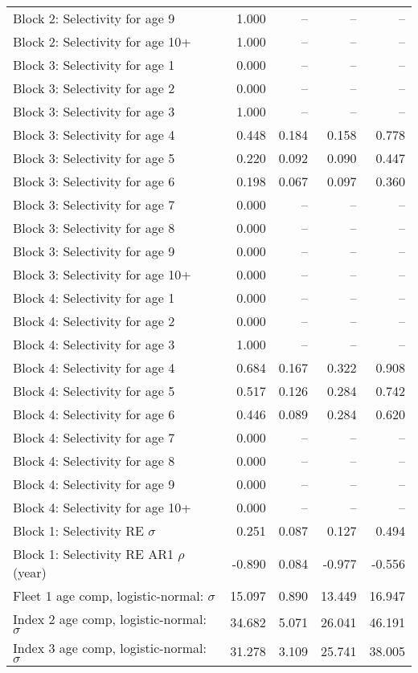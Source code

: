 \documentclass[
]{article}
\begin{document}
\begin{landscape}
\begin{longtable}[t]{lrrrr}
\addlinespace
Block 2: Selectivity for age 9 & 1.000 & -- & -- & --\\
Block 2: Selectivity for age 10+ & 1.000 & -- & -- & --\\
Block 3: Selectivity for age 1 & 0.000 & -- & -- & --\\
Block 3: Selectivity for age 2 & 0.000 & -- & -- & --\\
Block 3: Selectivity for age 3 & 1.000 & -- & -- & --\\
\addlinespace
Block 3: Selectivity for age 4 & 0.448 & 0.184 & 0.158 & 0.778\\
Block 3: Selectivity for age 5 & 0.220 & 0.092 & 0.090 & 0.447\\
Block 3: Selectivity for age 6 & 0.198 & 0.067 & 0.097 & 0.360\\
Block 3: Selectivity for age 7 & 0.000 & -- & -- & --\\
Block 3: Selectivity for age 8 & 0.000 & -- & -- & --\\
\addlinespace
Block 3: Selectivity for age 9 & 0.000 & -- & -- & --\\
Block 3: Selectivity for age 10+ & 0.000 & -- & -- & --\\
Block 4: Selectivity for age 1 & 0.000 & -- & -- & --\\
Block 4: Selectivity for age 2 & 0.000 & -- & -- & --\\
Block 4: Selectivity for age 3 & 1.000 & -- & -- & --\\
\addlinespace
Block 4: Selectivity for age 4 & 0.684 & 0.167 & 0.322 & 0.908\\
Block 4: Selectivity for age 5 & 0.517 & 0.126 & 0.284 & 0.742\\
Block 4: Selectivity for age 6 & 0.446 & 0.089 & 0.284 & 0.620\\
Block 4: Selectivity for age 7 & 0.000 & -- & -- & --\\
Block 4: Selectivity for age 8 & 0.000 & -- & -- & --\\
\addlinespace
Block 4: Selectivity for age 9 & 0.000 & -- & -- & --\\
Block 4: Selectivity for age 10+ & 0.000 & -- & -- & --\\
Block 1: Selectivity RE $\sigma$ & 0.251 & 0.087 & 0.127 & 0.494\\
Block 1: Selectivity RE AR1 $\rho$ (year) & -0.890 & 0.084 & -0.977 & -0.556\\
Fleet 1 age comp, logistic-normal: $\sigma$ & 15.097 & 0.890 & 13.449 & 16.947\\
\addlinespace
Index 2 age comp, logistic-normal: $\sigma$ & 34.682 & 5.071 & 26.041 & 46.191\\
Index 3 age comp, logistic-normal: $\sigma$ & 31.278 & 3.109 & 25.741 & 38.005\\*
\end{longtable}
\end{landscape}
\end{document}
